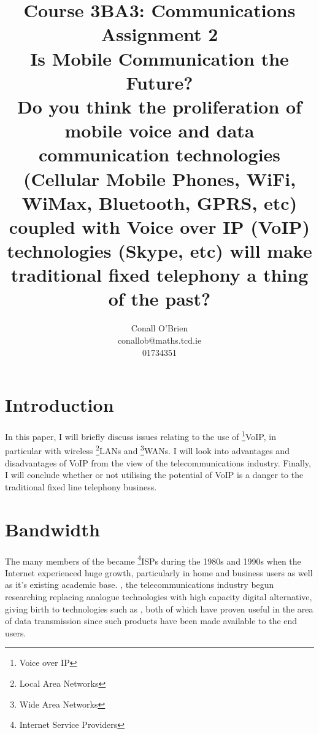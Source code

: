 \documentclass[a4paper,12pt]{article}
\begin{document}
\title{Course 3BA3: Communications \\ \vspace{10mm} Assignment 2 \\
\vspace{10mm} Is Mobile Communication the Future? \\ \vspace{10mm}
{\small Do you think the proliferation of mobile voice and data communication
technologies (Cellular Mobile Phones, WiFi, WiMax, Bluetooth, GPRS, etc)
coupled with Voice over IP (VoIP) technologies (Skype, etc) will make
traditional fixed telephony a thing of the past?}}

\author{Conall O'Brien \\ conallob@maths.tcd.ie \\ 01734351}

\maketitle

\section{Introduction}

In this paper, I will briefly discuss issues relating to the use of
\footnote{Voice over IP}{VoIP}, in particular with wireless 
\footnote{Local Area Networks}{LANs} and 
\footnote{Wide Area Networks}{WANs}. I will look into advantages
and disadvantages of VoIP from the view of the telecommunications 
industry. Finally, I will conclude whether or not utilising the
potential of VoIP is a danger to the traditional fixed line telephony
business.

\section{Bandwidth}

The many members of the 
\cite[traditional telecommunications industry]{wikipedia-isp}
became
\footnote{Internet Service Providers}{ISPs}
during the 1980s and 1990s when the Internet experienced huge growth,
particularly in home and business users as well as it's existing 
academic base. \cite[In the 1970s]{wikipedia-pstn}, the 
telecommunications industry begun researching replacing analogue
technologies with high capacity digital alternative, giving birth to
technologies such as 
\cite[\footnote{Digital Line Subscriber}{DSL} and 
\footnote{Integrated Systems Digital Network}{ISDN}]{wikipedia-pstn},
both of which have proven useful in the area of data transmission since
such products have been made available to the end users.
\end{document}
